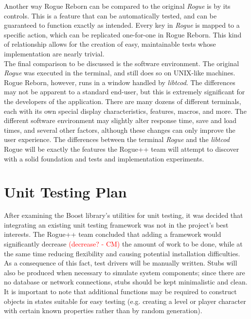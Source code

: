 \documentclass[12pt, titlepage]{article}
\begin{document}
	Another way Rogue Reborn can be compared to the original \textit{Rogue} is by its controls.  This is a feature that can be automatically tested, and can be guaranteed to function exactly as intended.  Every key in \textit{Rogue} is mapped to a specific action, which can be replicated one-for-one in Rogue Reborn.  This kind of relationship allows for the creation of easy, maintainable tests whose implementation are nearly trivial.\\

	The final comparison to be discussed is the software environment.  The original \textit{Rogue} was executed in the terminal, and still does so on UNIX-like machines.  Rogue Reborn, however, runs in a window handled by \textit{libtcod}.  The differences may not be apparent to a standard end-user, but this is extremely significant for the developers of the application.  There are many dozens of different terminals, each with its own special display characteristics, features, macros, and  more.  The different software environment may slightly alter response time, save and load times, and several other factors, although these changes can only improve the user experience.  The differences between the terminal \textit{Rogue} and the \textit{libtcod} Rogue will be exactly the features the Rogue++ team will attempt to discover with a solid foundation and tests and implementation experiments.
	
	
\newpage
\section{Unit Testing Plan}
\label{section6}
	
	After examining the Boost library's utilities for unit testing, it was decided that integrating an existing unit testing framework was not in the project's best interests.  The Rogue++ team concluded that adding a framework would significantly decrease \textcolor{red}{(decrease? - CM)} the amount of work to be done, while at the same time reducing flexibility and causing potential installation difficulties.  As a consequence of this fact, test drivers will be manually written.  Stubs will also be produced when necessary to simulate system components; since there are no database or network connections, stubs should be kept minimalistic and clean.  It is important to note that additional functions may be required to construct objects in states suitable for easy testing (e.g. creating a level or player character with certain known properties rather than by random generation).
	
\end{document}
